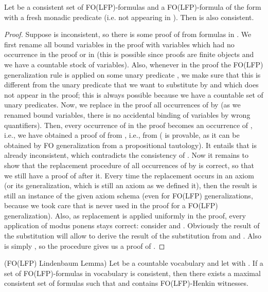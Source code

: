 \documentclass{LMCS}
\newcommand{\fo}{\textsf{FO}\xspace}
\newcommand{\folfp}{\textsf{FO(LFP)}\xspace}
\begin{document}
\begin{lem}
Let  be a consistent set of \folfp-formulas and  a
\folfp-formula of the form  with  a fresh monadic predicate (i.e. not appearing in
). Then  is also consistent.
\label{lemma6}
\end{lem}
\begin{proof}
Suppose 
is inconsistent, so there is some proof of  from formulas in
. We first
rename all bound variables in the proof with variables which had
no occurrence in the proof or in  (this is possible since proofs are finite objects and we have
a countable stock of variables). Also, whenever in the proof the
\folfp generalization rule is applied on some unary predicate ,
we make sure that this  is different from the unary predicate
that we want to substitute by  and which does not appear
in the proof; this is always possible because we have a countable
set of unary predicates. Now, we replace in the proof all
occurrences of  by  (as we renamed bound variables,
there is no accidental binding of variables by wrong quantifiers).
Then, every occurrence of 
in the proof becomes an occurrence of , i.e., we have obtained a proof of
 from , i.e., from  ( is provable, as it can be obtained by
\fo generalization from a propositional tautology). It
entails that  is already inconsistent, which contradicts
the consistency of . Now it remains to show that the
replacement procedure of all occurrences of  by  is
correct, so that we still have a proof of  after it. Every
time the replacement occurs in an axiom (or its generalization,
which is still an axiom as we defined it), then the result is
still an instance of the given axiom schema (even for \folfp
generalizations, because we took care that  is never used in
the proof for a \folfp generalization). Also, as replacement is
applied uniformly in the proof, every application of modus ponens
stays correct: consider  and .
Obviously the result  of the substitution will allow to
derive the result  of the substitution from  and . Also  is simply ,
so the procedure gives us a proof of .
\end{proof}


\begin{lem}(\folfp Lindenbaum Lemma)
Let  be a countable vocabulary and let  with . If a set  of \folfp-formulas in vocabulary  is consistent, then there exists a maximal
consistent set  of  formulas such that  and  contains \folfp-Henkin
witnesses.
\label{folfplind}
\end{lem}
\end{document}
